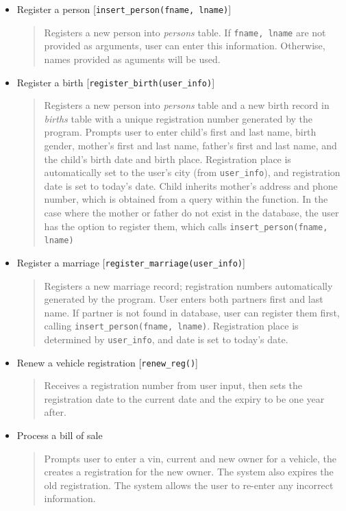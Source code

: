 \documentclass[10pt, a4paper]{article}
\begin{document}
{\begin{itemize}
\item Register a person [\texttt{insert\_person(fname, lname)}]
	\begin{quotation}
	\noindent Registers a new person into \emph{persons} table. If \texttt{fname, lname} are not provided as arguments, user can enter this information. Otherwise, names provided as aguments will be used. 
	\end{quotation}
	
\item Register a birth [\texttt{register\_birth(user\_info)}]
	\begin{quotation}
	\noindent Registers a new person into \emph{persons} table and a new birth record in \emph{births} table with a unique registration number generated by the program. Prompts user to enter child's first and last name, birth gender, mother's first and last name, father's first and last name, and the child's birth date and birth place. Registration place is automatically set to the user's city (from \texttt{user\_info}), and registration date is set to today's date. Child inherits mother's address and phone number, which is obtained from a query within the function. In the case where the mother or father do not exist in the database, the user has the option to register them, which calls \texttt{insert\_person(fname, lname)}
	\end{quotation}
	
\item Register a marriage [\texttt{register\_marriage(user\_info)}]
	\begin{quotation}
	\noindent Registers a new marriage record; registration numbers automatically generated by the program. User enters both partners first and last name. If partner is not found in database, user can register them first, calling \texttt{insert\_person(fname, lname)}. Registration place is determined by \texttt{user\_info}, and date is set to today's date. 
	\end{quotation}
	
\item Renew a vehicle registration [\texttt{renew\_reg()}]
	\begin{quotation}
	\noindent Receives a registration number from user input, then sets the registration date to the current date and the expiry to be one year after.
	\end{quotation}

\item Process a bill of sale
	\begin{quotation}
	\noindent Prompts user to enter a vin, current and new owner for a vehicle, the creates a registration for the new owner. The system also expires the old registration. The system allows the user to re-enter any incorrect information.
	\end{quotation}


\end{itemize}}
\end{document}
